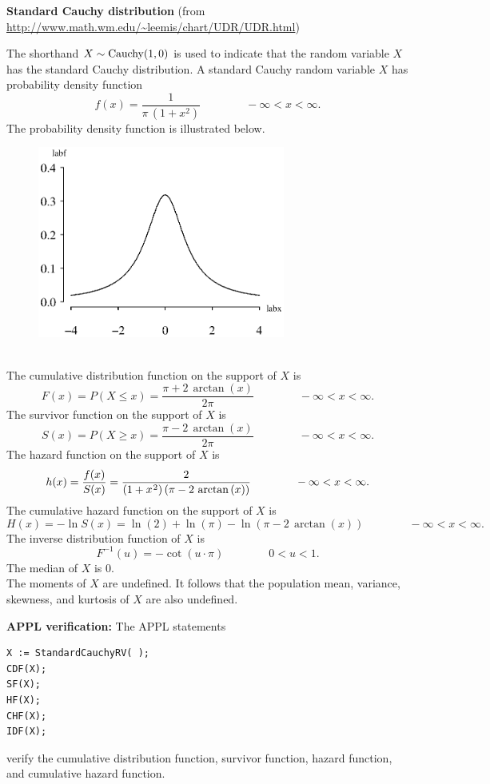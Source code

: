 \documentclass[12pt,fullpage]{article}
\begin{document}
\noindent
{\bf Standard Cauchy distribution}  (from \color{blue}\url{http://www.math.wm.edu/~leemis/chart/UDR/UDR.html}\color{black})

\noindent
The shorthand $X \sim {\rm Cauchy}(1,0)$ is used to indicate that the
random variable $X$ has the standard Cauchy distribution.
A standard Cauchy random variable $X$ has probability density function 
$$
f(x) = {\frac {1}{\pi \, \left( 1+{x}^{2} \right) }} \qquad \qquad -\infty<x<\infty.
$$
The probability density function is illustrated below.
{\begin{figure}[h!]
\begin{center}
\includegraphics[width=3.2in]{StandardcauchyPlot.ps}
\end{center}
\end{figure}}\\
The cumulative distribution function on the support of $X$ is
$$
F(x) = P(X \le x) = {\frac {\pi +2\,\arctan \left( x \right) }{2\pi }} \qquad \qquad -\infty<x<\infty.
$$
The survivor function on the support of $X$ is
$$
S(x) = P(X \ge x) = {\frac {\pi -2\,\arctan \left( x \right) }{2\pi }} \qquad \qquad -\infty<x<\infty.
$$
The hazard function on the support of $X$ is
$$
h(x) = \frac{f(x)}{S(x)} = {\frac {2}{ \left( 1+{x}^{\kern 0.08 em 2} \right)  \left( \pi -2\,\arctan \left( x \right)  \right) }} \qquad \qquad -\infty<x<\infty.
$$
The cumulative hazard function on the support of $X$ is
$$
H(x) = - \ln S(x) = \ln  \left( 2 \right) +\ln  \left( \pi  \right) -\ln  \left( \pi -2\,\arctan \left( x \right)  \right)   \qquad \qquad -\infty<x<\infty.
$$
The inverse distribution function of $X$ is
$$
F ^ {-1}(u) = -\cot(u\cdot \pi) \qquad \qquad 0 < u < 1.
$$
The median of $X$ is 0.
$$
$$
The moments of $X$ are undefined. It follows that the population mean, variance, skewness, and kurtosis of $X$ are also undefined.

\vspace{0.1in}

\noindent
{\bf APPL verification:}
The APPL statements
\begin{verbatim}
X := StandardCauchyRV( );
CDF(X);
SF(X);
HF(X);
CHF(X);
IDF(X);
\end{verbatim}
verify the cumulative distribution function, survivor function, hazard function, and cumulative hazard function.
\end{document}
